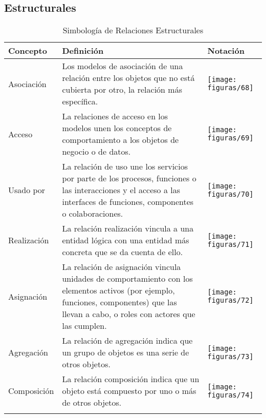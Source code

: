   \subsection{Estructurales}
    \begin{longtable}
    	{|m{3cm}|m{4.8cm}|m{4.8cm}|}
    	\toprule
    	Concepto & Definición & Notación \\
    	\midrule
    	Asociación & Los modelos de asociación de una relación entre los objetos que no está cubierta por otro, la relación más específica. & \texttt{[image: figuras/68]} \\ \hline
    	Acceso & La relaciones de acceso en los modelos unen los conceptos de comportamiento a los objetos de negocio o de datos. & \texttt{[image: figuras/69]} \\ \hline
    	Usado por & La relación de uso une los servicios por parte de los procesos, funciones o las interacciones y el acceso a las interfaces de funciones, componentes o colaboraciones. & \texttt{[image: figuras/70]} \\ \hline
    	Realización & La relación realización vincula a una entidad lógica con una entidad más concreta que se da cuenta de ello. & \texttt{[image: figuras/71]} \\ \hline
    	Asignación & La relación de asignación vincula unidades de comportamiento con los elementos activos (por ejemplo, funciones, componentes) que las llevan a cabo, o roles con actores que las cumplen. & \texttt{[image: figuras/72]} \\ \hline
    	Agregación & La relación de agregación indica que un grupo de objetos es una serie de otros objetos. & \texttt{[image: figuras/73]} \\ \hline
    	Composición & La relación composición indica que un objeto está compuesto por uno o más de otros objetos. & \texttt{[image: figuras/74]} \\
  	    \bottomrule
    	\captionsetup{width=.95\textwidth}
    	\caption{Simbología de Relaciones Estructurales}
    	\label{tabla32}
    \end{longtable}
    

